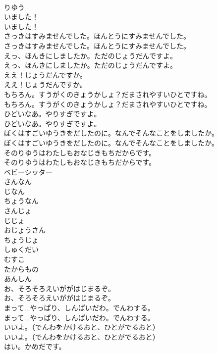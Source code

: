 \documentclass[8pt]{extreport}
\begin{document}
\begin{CJK}{UTF8}{min}
\\	りゆう
\\	いました！	
\\	いました！ 
\\	さっきはすみませんでした。ほんとうにすみませんでした。	
\\	さっきはすみませんでした。ほんとうにすみませんでした。 
\\	えっ、ほんきにしましたか。ただのじょうだんですよ。	
\\	えっ、ほんきにしましたか。ただのじょうだんですよ。 
\\	ええ！じょうだんですか。	
\\	ええ！じょうだんですか。 
\\	もちろん。すうがくのきょうかしょ？だまされやすいひとですね。	
\\	もちろん。すうがくのきょうかしょ？だまされやすいひとですね。 
\\	ひどいなあ。やりすぎですよ。	
\\	ひどいなあ。やりすぎですよ。 
\\	ぼくはすごいゆうきをだしたのに。なんでそんなことをしましたか。	
\\	ぼくはすごいゆうきをだしたのに。なんでそんなことをしましたか。 
\\	そのりゆうはわたしもおなじきもちだからです。	
\\	そのりゆうはわたしもおなじきもちだからです。 
\\	ベビーシッター
\\	さんなん
\\	じなん
\\	ちょうなん
\\	さんじょ
\\	じじょ
\\	おじょうさん
\\	ちょうじょ
\\	しゅくだい
\\	むすこ
\\	たからもの
\\	あんしん
\\	お、そろそろえいががはじまるぞ。	
\\	お、そろそろえいががはじまるぞ。 
\\	まって...やっぱり、しんぱいだわ。でんわする。	
\\	まって...やっぱり、しんぱいだわ。でんわする。 
\\	いいよ。（でんわをかけるおと、ひとがでるおと）	
\\	いいよ。（でんわをかけるおと、ひとがでるおと） 
\\	はい。かめだです。	

\end{CJK}
\end{document}
